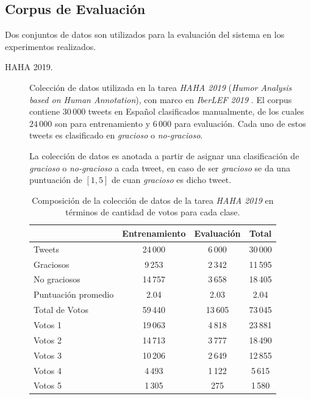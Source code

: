 \subsection{Corpus de Evaluación}\label{section:evaluation-corpus}

Dos conjuntos de datos son utilizados para la evaluación del sistema en los experimentos realizados.

\begin{description}

\item[HAHA 2019.]
Colección de datos utilizada en la tarea \emph{HAHA 2019} (\emph{Humor Analysis based on Human Annotation}), con marco en \emph{IberLEF 2019} \parencite{chiruzzo2019overview}.
El corpus contiene $30\,000$ tweets en Español clasificados manualmente, de los cuales $24\,000$ son para entrenamiento y $6\,000$ para evaluación.
Cada uno de estos tweets es clasificado en \emph{gracioso} o \emph{no-gracioso}.

La colección de datos es anotada a partir de asignar una clasificación de \emph{gracioso} o \emph{no-gracioso} a cada tweet, en caso de ser \emph{gracioso} se da una puntuación de $[1,5]$ de cuan \emph{gracioso} es dicho tweet.

\begin{table}[H]
    \centering
    \begin{tabular}{lccc}
    \toprule
                            & Entrenamiento & Evaluación & Total   \\\midrule
        Tweets              & 24\,000       & 6\,000     & 30\,000 \\
        Graciosos           & 9\,253        & 2\,342     & 11\,595 \\
        No graciosos        & 14\,757       & 3\,658     & 18\,405 \\
        Puntuación promedio & 2.04          & 2.03       & 2.04    \\\midrule
        Total de Votos      & 59\,440       & 13\,605    & 73\,045 \\
        Votos 1             & 19\,063       & 4\,818     & 23\,881 \\
        Votos 2             & 14\,713       & 3\,777     & 18\,490 \\
        Votos 3             & 10\,206       & 2\,649     & 12\,855 \\
        Votos 4             &  4\,493       & 1\,122     &  5\,615 \\
        Votos 5             &  1\,305       &    275     &  1\,580 \\
    \bottomrule
    \end{tabular}
    \caption{Composición de la colección de datos de la tarea \emph{HAHA 2019} en términos de cantidad de votos para cada clase.}
    \label{table:haha2019info}
\end{table}


\end{description}

